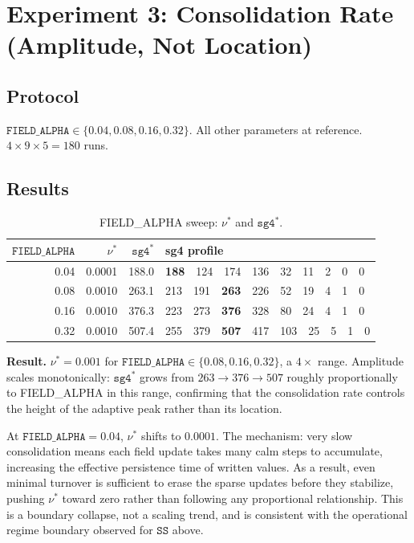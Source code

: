 \documentclass[11pt]{article}
\theoremstyle{remark}
\begin{document}
\section{Experiment 3: Consolidation Rate (Amplitude, Not Location)}

\subsection{Protocol}

$\mathtt{FIELD\_ALPHA} \in \{0.04, 0.08, 0.16, 0.32\}$. All other parameters
at reference. $4 \times 9 \times 5 = 180$ runs.

\subsection{Results}

\begin{table}[h]
\centering
\caption{FIELD\_ALPHA sweep: $\nu^*$ and $\mathtt{sg4}^*$.}
\label{tab:exp3}
\begin{tabular}{r r r l}
\toprule
$\mathtt{FIELD\_ALPHA}$ & $\nu^*$ & $\mathtt{sg4}^*$ & sg4 profile \\
\midrule
0.04 & 0.0001 & 188.0 & \textbf{188}\ \ 124\ \ 174\ \ 136\ \ 32\ \ 11\ \ 2\ \ 0\ \ 0 \\
0.08 & 0.0010 & 263.1 & 213\ \ 191\ \ \textbf{263}\ \ 226\ \ 52\ \ 19\ \ 4\ \ 1\ \ 0 \\
0.16 & 0.0010 & 376.3 & 223\ \ 273\ \ \textbf{376}\ \ 328\ \ 80\ \ 24\ \ 4\ \ 1\ \ 0 \\
0.32 & 0.0010 & 507.4 & 255\ \ 379\ \ \textbf{507}\ \ 417\ \ 103\ \ 25\ \ 5\ \ 1\ \ 0 \\
\bottomrule
\end{tabular}
\end{table}

\textbf{Result.} $\nu^* = 0.001$ for $\mathtt{FIELD\_ALPHA} \in \{0.08, 0.16, 0.32\}$,
a $4\times$ range. Amplitude scales monotonically: $\mathtt{sg4}^*$ grows from
$263 \to 376 \to 507$ roughly proportionally to FIELD\_ALPHA in this range,
confirming that the consolidation rate controls the height of the adaptive peak
rather than its location.

At $\mathtt{FIELD\_ALPHA} = 0.04$, $\nu^*$ shifts to $0.0001$. The mechanism:
very slow consolidation means each field update takes many calm steps to accumulate,
increasing the effective persistence time of written values. As a result, even
minimal turnover is sufficient to erase the sparse updates before they stabilize,
pushing $\nu^*$ toward zero rather than following any proportional relationship.
This is a boundary collapse, not a scaling trend, and is consistent with the
operational regime boundary observed for $\mathtt{SS}$ above.
\end{document}
